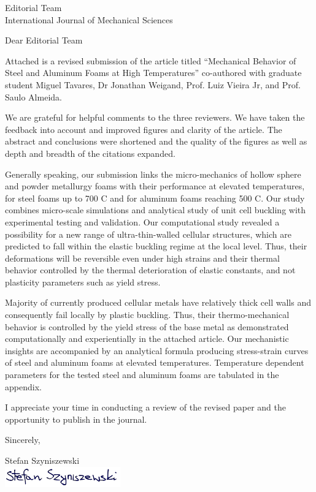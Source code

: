 \documentclass[11pt]{durhamLetter}
\newcommand{\JournalName}{International Journal of Mechanical Sciences}
\begin{document}
\begin{letter}{
		Editorial Team \\
		\JournalName
               }

\opening{Dear Editorial Team}

Attached is a revised submission of the article titled “Mechanical Behavior of Steel and Aluminum Foams at High Temperatures” co-authored with graduate student Miguel Tavares, Dr Jonathan Weigand, Prof. Luiz Vieira Jr, and Prof. Saulo Almeida.

We are grateful for helpful comments to the three reviewers. We have taken the feedback into account and improved figures and clarity of the article. The abstract and conclusions were shortened and the quality of the figures as well as depth and breadth of the citations expanded.

Generally speaking, our submission links the micro-mechanics of hollow sphere and powder metallurgy foams with their performance at elevated temperatures, for steel foams up to 700 C and for aluminum foams reaching 500 C. Our study combines micro-scale simulations and analytical study of unit cell buckling with experimental testing and validation. Our computational study revealed a possibility for a new range of ultra-thin-walled cellular structures, which are predicted to fall within the elastic buckling regime at the local level. Thus, their deformations will be reversible even under high strains and their thermal behavior controlled by the thermal deterioration of elastic constants, and not plasticity parameters such as yield stress. 

Majority of currently produced cellular metals have relatively thick cell walls and consequently fail locally by plastic buckling. Thus, their thermo-mechanical behavior is controlled by the yield stress of the base metal as demonstrated computationally and experientially in the attached article. Our mechanistic insights are accompanied by an analytical formula producing stress-strain curves of steel and aluminum foams at elevated temperatures. Temperature dependent parameters for the tested steel and aluminum foams are tabulated in the appendix.

I appreciate your time in conducting a review of the revised paper and the opportunity to publish in the journal.

Sincerely,

\vspace{1\parskip}%

\closing{ Stefan Szyniszewski \\
	\includegraphics[width=0.8\linewidth]{Signature.png}
}




\end{letter}
\end{document}
